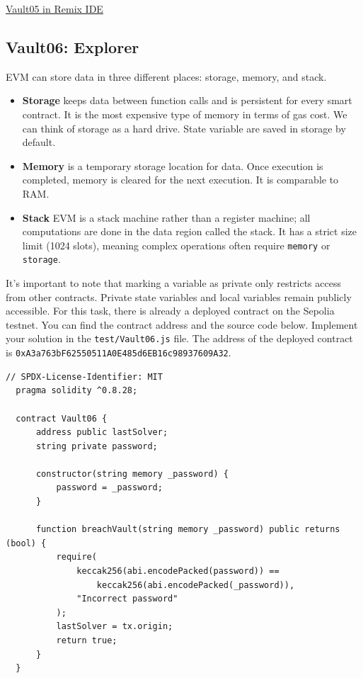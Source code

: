 \documentclass[12pt]{article}
\begin{document}
\medskip
\noindent
\href{https://remix.ethereum.org/?#activate=solidity&url=https://github.com/radovluk/unbreakable-vault/contracts/Vault05.sol&lang=en&optimize=false&runs=200&evmVersion=null&version=soljson-v0.8.28+commit.7893614a.js}{Vault05 in Remix IDE}

\subsection*{Vault06: Explorer}

EVM can store data in three different places: storage, memory, and stack.

\begin{itemize}
\item \textbf{Storage} keeps data between function calls and is persistent for every smart contract. It is the most expensive type of memory in terms of gas cost. We can think of storage as a hard drive. State variable are saved in storage by default.

\item \textbf{Memory} is a temporary storage location for data. Once execution is completed, memory is cleared for the next execution. It is comparable to RAM.

\item \textbf{Stack} EVM is a stack machine rather than a register machine; all computations are done in the data region called the stack. It has a strict size limit (1024 slots), meaning complex operations often require \texttt{memory} or \texttt{storage}.

\end{itemize}

\noindent
It's important to note that marking a variable as private only restricts access from other contracts. Private state variables and local variables remain publicly accessible. For this task, there is already a deployed contract on the Sepolia testnet. You can find the contract address and the source code below. Implement your solution in the \texttt{test/Vault06.js} file. The address of the deployed contract is \texttt{0xA3a763bF62550511A0E485d6EB16c98937609A32}.

\begin{lstlisting}[language=Solidity]
  // SPDX-License-Identifier: MIT
  pragma solidity ^0.8.28;
  
  contract Vault06 {
      address public lastSolver;
      string private password;
  
      constructor(string memory _password) {
          password = _password;
      }
  
      function breachVault(string memory _password) public returns (bool) {
          require(
              keccak256(abi.encodePacked(password)) ==
                  keccak256(abi.encodePacked(_password)),
              "Incorrect password"
          );
          lastSolver = tx.origin;
          return true;
      }
  }
\end{lstlisting}
\end{document}

